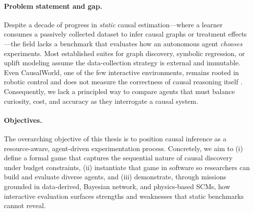 \paragraph{Problem statement and gap.}
Despite a decade of progress in \emph{static} causal estimation—where a learner consumes a passively collected dataset to infer causal graphs or treatment effects \citep{johansson2016learning,shalit2017estimating,alaa2017bayesian,yoon2018ganite,zheng2018dags,kalainathan2022structural,lippe2021efficient,Cranmer2020DiscoveringSMA,Biggio2021NeuralSRA}—the field lacks a benchmark that evaluates how an autonomous agent \emph{chooses} experiments. Most established suites for graph discovery, symbolic regression, or uplift modeling \citep{chengcausaltime,lawrence2021data,chevalley2023causalbench,olson2017pmlb,la2021contemporary,romano2021pmlb,CauseBox2021,ACCBench2024,CIPCaDBench2022,CausalDiscoveryFramework2024,RealCause2021,CausalBench2024,EvaluationFramework2022,IBM2022,DoWhy2021,Framework2021} assume the data-collection strategy is external and immutable. Even CausalWorld, one of the few interactive environments, remains rooted in robotic control and does not measure the correctness of causal reasoning itself \citep{ahmed2020causalworld}. Consequently, we lack a principled way to compare agents that must balance curiosity, cost, and accuracy as they interrogate a causal system.

\paragraph{Objectives.}
The overarching objective of this thesis is to position causal inference as a resource-aware, agent-driven experimentation process. Concretely, we aim to (i) define a formal game that captures the sequential nature of causal discovery under budget constraints, (ii) instantiate that game in software so researchers can build and evaluate diverse agents, and (iii) demonstrate, through missions grounded in data-derived, Bayesian network, and physics-based SCMs, how interactive evaluation surfaces strengths and weaknesses that static benchmarks cannot reveal.

